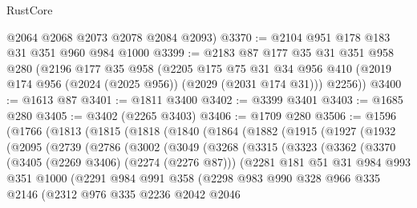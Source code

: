 \begin{lexlean}{RustCore}
\begin{coremodule}
      @2064
      @2068
      @2073
      @2078
      @2084
      @2093)
@3370 := @2104 @951 @178 @183 @31 @351 @960 @984 @1000
@3399 := @2183
    @87
    @177
    @35
    @31
    @351
    @958
    @280
    (@2196
      @177
      @35
      @958
      (@2205
        @175
        @75
        @31
        @34
        @956
        @410
        (@2019 @174 @956 (@2024 (@2025 @956)) (@2029 (@2031 @174 @31)))
        @2256))
@3400 := @1613 @87
@3401 := @1811 @3400
@3402 := @3399 @3401
@3403 := @1685 @280
@3405 := @3402 (@2265 @3403)
@3406 := @1709 @280
@3506 := @1596
    (@1766
      (@1813
        (@1815
          (@1818
            (@1840
              (@1864
                (@1882
                  (@1915
                    (@1927
                      (@1932
                        (@2095
                          (@2739
                            (@2786
                              (@3002
                                (@3049
                                  (@3268
                                    (@3315
                                      (@3323
                                        (@3362
                                          (@3370
                                            (@3405 (@2269 @3406) (@2274 (@2276 @87)))
                                            (@2281
                                              @181
                                              @51
                                              @31
                                              @984
                                              @993
                                              @351
                                              @1000
                                              (@2291
                                                @984
                                                @991
                                                @358
                                                (@2298
                                                  @983
                                                  @990
                                                  @328
                                                  @966
                                                  @335
                                                  @2146
                                                  (@2312
                                                    @976
                                                    @335
                                                    @2236
                                                    @2042
                                                    @2046

\end{coremodule}
\end{lexlean}
